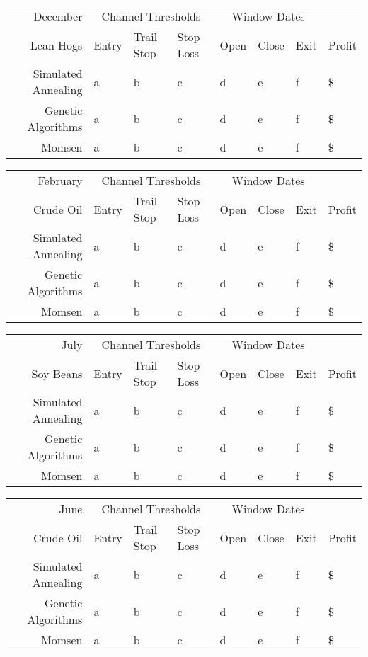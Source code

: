 \documentclass[10pt]{article}
\begin{document}
\begin{tabular}{|r|l|l|l|l|l|l|l|}
  \hline
  December  & \multicolumn{3}{|c|}{Channel Thresholds} & \multicolumn{3}{|c|}{Window Dates} &  \\
  Lean Hogs & Entry & Trail Stop & Stop Loss & Open & Close & Exit & Profit\\ \hline
  Simulated Annealing & a & b & c & d & e & f & \$ \\ \hline
  Genetic Algorithms & a & b & c & d & e & f & \$ \\ \hline
  Momsen &  a & b & c & d & e & f & \$ \\ \hline
\end{tabular}

\begin{tabular}{|r|l|l|l|l|l|l|l|}
  \hline
  February & \multicolumn{3}{|c|}{Channel Thresholds} & \multicolumn{3}{|c|}{Window Dates} &  \\
  Crude Oil & Entry & Trail Stop & Stop Loss & Open & Close & Exit & Profit\\ \hline
  Simulated Annealing & a & b & c & d & e & f & \$ \\ \hline
  Genetic Algorithms & a & b & c & d & e & f & \$ \\ \hline
  Momsen &  a & b & c & d & e & f & \$ \\ \hline
\end{tabular}

\begin{tabular}{|r|l|l|l|l|l|l|l|}
  \hline
  July & \multicolumn{3}{|c|}{Channel Thresholds} & \multicolumn{3}{|c|}{Window Dates} &  \\
  Soy Beans & Entry & Trail Stop & Stop Loss & Open & Close & Exit & Profit\\ \hline
  Simulated Annealing & a & b & c & d & e & f & \$ \\ \hline
  Genetic Algorithms & a & b & c & d & e & f & \$ \\ \hline
  Momsen &  a & b & c & d & e & f & \$ \\ \hline
\end{tabular}

\begin{tabular}{|r|l|l|l|l|l|l|l|}
  \hline
  June & \multicolumn{3}{|c|}{Channel Thresholds} & \multicolumn{3}{|c|}{Window Dates} &  \\
  Crude Oil & Entry & Trail Stop & Stop Loss & Open & Close & Exit & Profit\\ \hline
  Simulated Annealing & a & b & c & d & e & f & \$ \\ \hline
  Genetic Algorithms & a & b & c & d & e & f & \$ \\ \hline
  Momsen &  a & b & c & d & e & f & \$ \\ \hline
\end{tabular}
\end{document}

